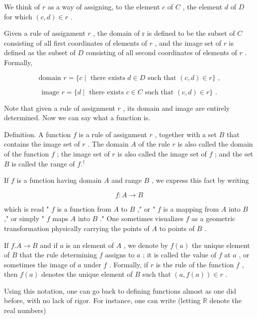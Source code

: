 We think of \(r\) as a way of assigning, to the element \(c\) of \(C\) , the element \(d\) of \(D\) for which \(\left( {c,d}\right)  \in  r\) .

Given a rule of assignment \(r\) , the domain of \(\mathrm{r}\) is defined to be the subset of \(C\) consisting of all first coordinates of elements of \(r\) , and the image set of \(r\) is defined as the subset of \(D\) consisting of all second coordinates of elements of \(r\) . Formally,

\[
\text{ domain }r = \{ c \mid  \text{ there exists }d \in  D\text{ such that }\left( {c,d}\right)  \in  r\} \text{ , }
\]

\[
\text{ image }r = \{ d \mid  \text{ there exists }c \in  C\text{ such that }\left( {c,d}\right)  \in  r\} \text{ . }
\]

Note that given a rule of assignment \(r\) , its domain and image are entirely determined. Now we can say what a function is.

Definition. A function \(f\) is a rule of assignment \(r\) , together with a set \(B\) that contains the image set of \(r\) . The domain \(A\) of the rule \(r\) is also called the domain of the function \(f\) ; the image set of \(r\) is also called the image set of \(f\) ; and the set \(B\) is called the range of \(f{.}^{ \dagger  }\)

If \(f\) is a function having domain \(A\) and range \(B\) , we express this fact by writing

\[
f : A \rightarrow  B
\]

which is read " \(f\) is a function from \(A\) to \(B\) ," or " \(f\) is a mapping from \(A\) into \(B\) ," or simply " \(f\) maps \(A\) into \(B\) ." One sometimes visualizes \(f\) as a geometric transformation physically carrying the points of \(A\) to points of \(B\) .

If \(f.A \rightarrow  B\) and if \(a\) is an element of \(A\) , we denote by \(f\left( a\right)\) the unique element of \(B\) that the rule determining \(f\) assigns to \(a\) ; it is called the value of \(f\) at \(a\) , or sometimes the image of \(a\) under \(f\) . Formally, if \(r\) is the rule of the function \(f\) , then \(f\left( a\right)\) denotes the unique element of \(B\) such that \(\left( {a,f\left( a\right) }\right)  \in  r\) .

Using this notation, one can go back to defining functions almost as one did before, with no lack of rigor. For instance, one can write (letting \(\mathbb{R}\) denote the real numbers)

